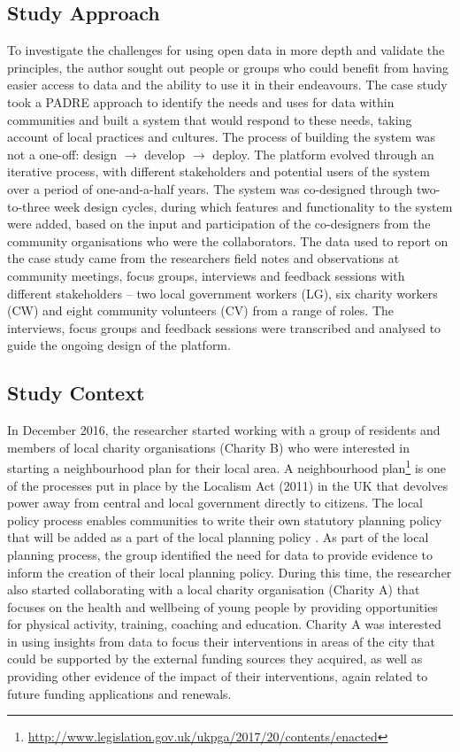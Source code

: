 \subsection{Study Approach}
To investigate the challenges for using open data in more depth and validate the principles, the author sought out people or groups who could benefit from having easier access to data and the ability to use it in their endeavours. The case study took a PADRE approach \citep{haj-bolouri_padre_2016,haj-bolouri_introducing_2015} to identify the needs and uses for data within communities and built a system that would respond to these needs, taking account of local practices and cultures. The process of building the system was not a one-off: design $\rightarrow$ develop $\rightarrow$ deploy. The platform evolved through an iterative process, with different stakeholders and potential users of the system over a period of one-and-a-half years. The system was co-designed through two-to-three week design cycles, during which features and functionality to the system were added, based on the input and participation of the co-designers from the community organisations who were the collaborators. The data used to report on the case study came from the researchers field notes and observations at community meetings, focus groups, interviews and feedback sessions with different stakeholders -- two local government workers (LG), six charity workers (CW) and eight community volunteers (CV) from a range of roles. The interviews, focus groups and feedback sessions were transcribed and analysed to guide the ongoing design of the platform.

\subsection{Study Context}
In December 2016, the researcher started working with a group of residents and members of local charity organisations (Charity B) who were interested in starting a neighbourhood plan for their local area. A neighbourhood plan\footnote{\url{http://www.legislation.gov.uk/ukpga/2017/20/contents/enacted}} is one of the processes put in place by the Localism Act (2011) in the UK that devolves power away from central and local government directly to citizens. The local policy process enables communities to write their own statutory planning policy that will be added as a part of the local planning policy \citep{gallent_neighbourhood_2012,stanton_big_2014}. As part of the local planning process, the group identified the need for data to provide evidence to inform the creation of their local planning policy. During this time, the researcher also started collaborating with a local charity organisation (Charity A) that focuses on the health and wellbeing of young people by providing opportunities for physical activity, training, coaching and education. Charity A was interested in using insights from data to focus their interventions in areas of the city that could be supported by the external funding sources they acquired, as well as providing other evidence of the impact of their interventions, again related to future funding applications and renewals.

